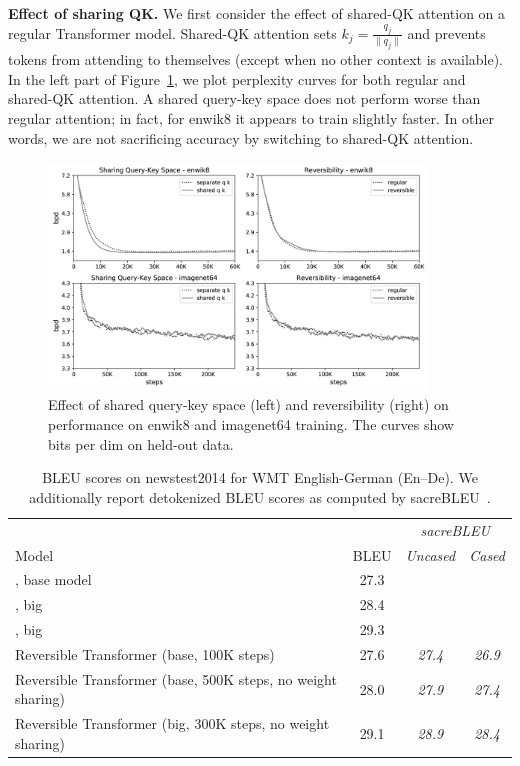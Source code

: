 \documentclass{article} %
\renewcommand{\paragraph}[1]{\textbf{#1}}
\begin{document}
\paragraph{Effect of sharing QK.} \label{sec:exp_qk}
We first consider the effect of shared-QK attention on a regular Transformer model. Shared-QK attention sets $k_j = \frac{q_j}{\|q_j\|}$ and prevents tokens from attending to themselves (except when no other context is available). In the left part of Figure~\ref{fig:share-qk-rev}, we plot perplexity curves for both regular and shared-QK attention. A shared query-key space does not perform worse than regular attention; in fact, for enwik8 it appears to train slightly faster. In other words, we are not sacrificing accuracy by switching to shared-QK attention. 

\begin{figure}[t]
    \centering
    \includegraphics[width=0.9\textwidth]{figures/joint_qk_rev_plot.png}
    \caption{Effect of shared query-key space (left) and reversibility (right) on 
    performance on enwik8 and imagenet64 training. The curves show bits per dim on held-out data.}
    \label{fig:share-qk-rev}
\end{figure}

\begin{table}
\caption{BLEU scores on newstest2014 for WMT English-German (En–De). We additionally report detokenized BLEU scores as computed by sacreBLEU~\citep{sacrebleu}.}
\label{tab:wmt}
\begin{center}
\begin{tabular}{lccc}
&& \multicolumn{2}{c}{\textit{sacreBLEU}} \\
Model & BLEU & \textit{Uncased}\footnotemark[3] & \textit{Cased}\footnotemark[4] \\
\hline
\citet{transformer}, base model & 27.3 \\
\citet{transformer}, big & 28.4 \\
\citet{ott2018scaling}, big & 29.3 \\
\hline
Reversible Transformer (base, 100K steps) & 27.6 & \textit{27.4} & \textit{26.9} \\
Reversible Transformer (base, 500K steps, no weight sharing) & 28.0 & \textit{27.9} & \textit{27.4} \\
Reversible Transformer (big, 300K steps, no weight sharing) & 29.1 & \textit{28.9} & \textit{28.4}
\end{tabular}
\end{center}
\end{table}
\end{document}
